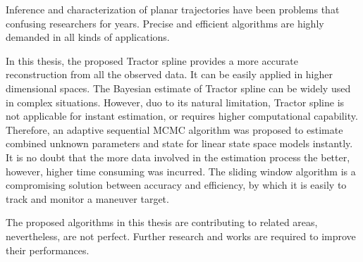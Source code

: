 

Inference and characterization of planar trajectories have been problems that confusing researchers for years. Precise and efficient algorithms are highly demanded in all kinds of applications. 

In this thesis, the proposed Tractor spline provides a more accurate reconstruction from all the observed data. It can be easily applied in higher dimensional spaces. The Bayesian estimate of Tractor spline can be widely used in complex situations. However, duo to its natural limitation, Tractor spline is not applicable for instant estimation, or requires higher computational capability.  Therefore, an adaptive sequential MCMC algorithm was proposed to estimate combined unknown parameters and state for linear state space models instantly. It is no doubt that the more data involved in the estimation process the better, however, higher time consuming was incurred. The sliding window algorithm is a compromising solution between accuracy and efficiency, by which it is easily to track and monitor a maneuver target. 

The proposed algorithms in this thesis are contributing to related areas, nevertheless, are not perfect. Further research and works are required to improve their performances. 
